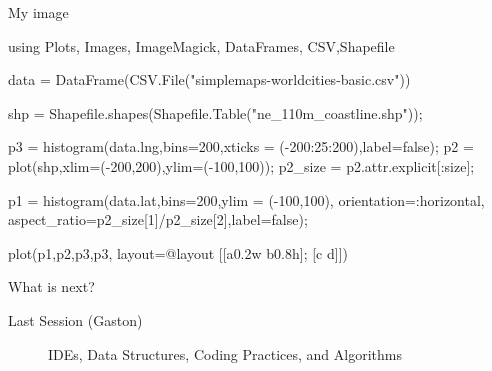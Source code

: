 \documentclass{beamer}
\newenvironment{Boxx}{\begin{tcolorbox}[standard jigsaw, opacityframe=0.8, opacityback=0.0,left=2pt,right=2pt,top=0pt,bottom=0pt]}{\end{tcolorbox}}
\begin{document}
\begin{frame}[fragile]{My image}


	
\begin{Boxx}
\begin{jllisting}	
 using Plots, Images, ImageMagick, DataFrames, CSV,Shapefile
 
 data = DataFrame(CSV.File("simplemaps-worldcities-basic.csv"))
 
 shp = Shapefile.shapes(Shapefile.Table("ne_110m_coastline.shp"));
 
 p3 = histogram(data.lng,bins=200,xticks = (-200:25:200),label=false);
 p2 = plot(shp,xlim=(-200,200),ylim=(-100,100));
 p2_size = p2.attr.explicit[:size];
 
 p1 = histogram(data.lat,bins=200,ylim = (-100,100),
 	orientation=:horizontal,
 	aspect_ratio=p2_size[1]/p2_size[2],label=false);
 
 plot(p1,p2,p3,p3,
 	layout=@layout [[a{0.2w} b{0.8h}]; [c d]])

	\end{jllisting}


	
	
	
	


\end{Boxx}		
		

\end{frame}




\begin{frame}{What is next?}
  \begin{description}
    \item[Last Session (Gaston)] IDEs, Data Structures, Coding Practices, and Algorithms
  \end{description}
\end{frame}
%	
%	
%	
%	
\end{document}
